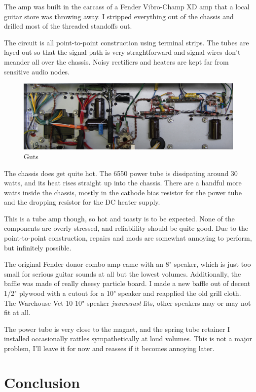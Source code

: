 \documentclass[pdftex,letterpaper,11pt]{article}
\begin{document}
The amp was built in the carcass of a Fender Vibro-Champ XD amp that a local guitar store was throwing away. I stripped everything out of the chassis and drilled most of the threaded standoffs out.

The circuit is all point-to-point construction using terminal strips. The tubes are layed out so that the signal path is very straghtforward and signal wires don't meander all over the chassis. Noisy rectifiers and heaters are kept far from sensitive audio nodes.

\begin{figure}[H]
\centering
\caption{Guts}
\includegraphics[width=\textwidth]{guts.jpg}
\end{figure}

The chassis does get quite hot. The 6550 power tube is dissipating around 30 watts, and its heat rises straight up into the chassis. There are a handful more watts inside the chassis, mostly in the cathode bias resistor for the power tube and the dropping resistor for the DC heater supply.

This is a tube amp though, so hot and toasty is to be expected. None of the components are overly stressed, and reliablility should be quite good. Due to the point-to-point construction, repairs and mods are somewhat annoying to perform, but infinitely possible.

The original Fender donor combo amp came with an 8" speaker, which is just too small for serious guitar sounds at all but the lowest volumes. Additionally, the baffle was made of really cheesy particle board. I made a new baffle out of decent 1/2" plywood with a cutout for a 10" speaker and reapplied the old grill cloth. The Warehouse Vet-10 10" speaker \textit{juuuuuust} fits, other speakers may or may not fit at all. 

The power tube is very close to the magnet, and the spring tube retainer I installed occasionally rattles sympathetically at loud volumes. This is not a major problem, I'll leave it for now and reasses if it becomes annoying later.

\section{Conclusion}
\end{document}

